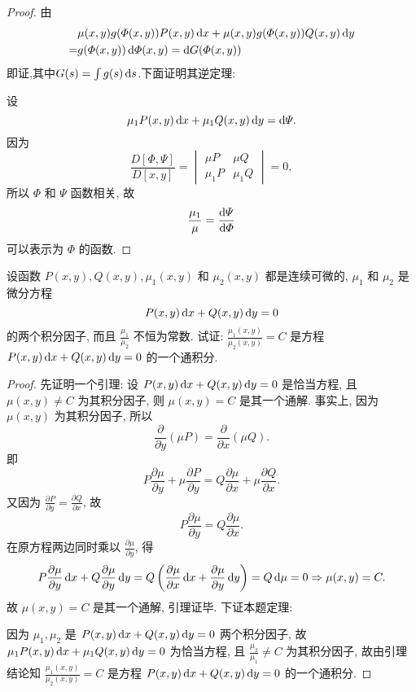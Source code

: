 \begin{proof}
由
\[\begin{split}
&\mu(x,y)g(\varPhi(x,y))P(x,y)\mathop{}\!\mathrm{d} x+\mu(x,y)g(\varPhi(x,y))Q(x,y)\mathop{}\!\mathrm{d} y\\
=&g(\varPhi(x,y))\mathop{}\!\mathrm{d}\varPhi(x,y)=\mathop{}\!\mathrm{d} G(\varPhi(x,y))
\end{split}\]
即证,其中$G(s)=\int g(s)\mathop{}\!\mathrm{d} s$.下面证明其逆定理:

设
\[\mu_1P(x,y)\mathop{}\!\mathrm{d} x+\mu_1Q(x,y)\mathop{}\!\mathrm{d} y=\mathop{}\!\mathrm{d}\varPsi.\]
因为
\[\frac{D[\varPhi,\varPsi]}{D[x,y]}=
  \begin{vmatrix}\mu P&\mu Q\\\mu_1P&\mu_1Q\end{vmatrix}=0,\]
所以 $\varPhi$ 和 $\varPsi$ 函数相关, 故 
\[\frac{\mu_1}{\mu}=\frac{\mathop{}\!\mathrm{d}\varPsi}{\mathop{}\!\mathrm{d}\varPhi}\]
可以表示为 $\varPhi$ 的函数.
\end{proof}



\begin{exercise}
  设函数 $P(x,y),Q(x,y),\mu_1(x,y)$ 和 $\mu_2(x,y)$ 都是连续可微的, $\mu_1$ 和 $\mu_2$ 是微分方程
  \[P(x,y)\mathop{}\!\mathrm{d} x+Q(x,y)\mathop{}\!\mathrm{d} y=0\]
  的两个积分因子, 而且 $\frac{\mu_1}{\mu_2}$ 不恒为常数.
  试证: $\frac{\mu_1(x,y)}{\mu_2(x,y)}=C$ 是方程 $P(x,y)\mathop{}\!\mathrm{d} x+Q(x,y)\mathop{}\!\mathrm{d} y=0$ 的一个通积分.
\end{exercise}

\begin{proof}
  先证明一个引理: 设 $P(x,y)\mathop{}\!\mathrm{d} x+Q(x,y)\mathop{}\!\mathrm{d} y=0$ 是恰当方程,
  且 $\mu(x,y)\neq C$ 为其积分因子, 则 $\mu(x,y)=C$ 是其一个通解. 事实上,
  因为 $\mu(x,y)$ 为其积分因子, 所以
  \[\frac{\partial}{\partial y}(\mu P)=\frac{\partial}{\partial x}(\mu Q).\]
  即
  \[P\frac{\partial\mu}{\partial y}+\mu\frac{\partial P}{\partial y}
    = Q\frac{\partial\mu}{\partial x}+\mu\frac{\partial Q}{\partial x}.\]
  又因为 $\frac{\partial P}{\partial y}=\frac{\partial Q}{\partial x}$, 故
  \[P\frac{\partial\mu}{\partial y}=Q\frac{\partial\mu}{\partial x}.\]
  在原方程两边同时乘以 $\frac{\partial\mu}{\partial y}$, 得
  \[P\frac{\partial\mu}{\partial y}\mathop{}\!\mathrm{d} x+Q\frac{\partial\mu}{\partial y}\mathop{}\!\mathrm{d} y
    = Q\left(\frac{\partial\mu}{\partial x}\mathop{}\!\mathrm{d} x+\frac{\partial\mu}{\partial y}\mathop{}\!\mathrm{d} y\right)
    = Q\mathop{}\!\mathrm{d}\mu=0\Rightarrow\mu(x,y)=C.\]
  故 $\mu(x,y)=C$ 是其一个通解, 引理证毕. 下证本题定理:

  因为 $\mu_1,\mu_2$ 是 $P(x,y)\mathop{}\!\mathrm{d} x+Q(x,y)\mathop{}\!\mathrm{d} y=0$ 两个积分因子,
  故 $\mu_1P(x,y)\mathop{}\!\mathrm{d} x+\mu_1Q(x,y)\mathop{}\!\mathrm{d} y=0$ 为恰当方程,
  且 $\frac{\mu_2}{\mu_1}\neq C$ 为其积分因子,
  故由引理结论知 $\frac{\mu_1(x,y)}{\mu_2(x,y)}=C$ 是方程 $P(x,y)\mathop{}\!\mathrm{d} x+Q(x,y)\mathop{}\!\mathrm{d} y=0$ 的一个通积分.
\end{proof}



